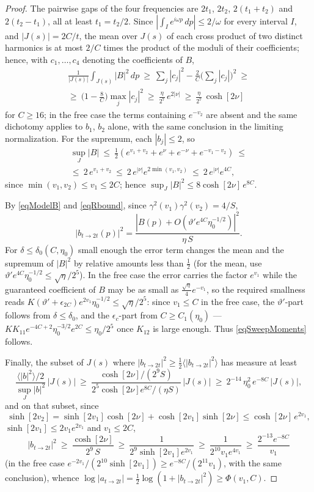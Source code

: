 \documentclass[11pt,twoside,reqno]{amsart}
\def\to{\rightarrow}
\def\d{\delta}
\def\g{\gamma}
\theoremstyle{plain}
\numberwithin{equation}{section}
\begin{document}
\begin{proof}
The pairwise gaps of the four frequencies are $2t_1$, $2t_2$, $2(t_1+t_2)$ and $2(t_2-t_1)$, all at least $t_1=t_2/2$. Since $\left|\int_Ie^{i\omega p}\,dp\right|\leq2/\omega$ for every interval $I$, and $|J(s)|=2C/t$, the mean over $J(s)$ of each cross product of two distinct harmonics is at most $2/C$ times the product of the moduli of their coefficients; hence, with $c_1,\dots,c_4$ denoting the coefficients of $B$,
\begin{multline*}\frac1{|J(s)|}\int_{J(s)}|B|^2\,dp\ \geq\ \sum_j|c_j|^2-\frac 2C\Big(\sum_j|c_j|\Big)^2\ \geq\\ \geq\ \Big(1-\frac{8}C\Big)\max_j|c_j|^2\ \geq\ \frac{\eta}{2^7}\,e^{2|\nu|}\ \geq\ \frac{\eta}{2^7}\,\cosh[2\nu]\end{multline*}
for $C\geq16$; in the free case the terms containing $e^{-v_2}$ are absent and the same dichotomy applies to $b_1$, $b_2$ alone, with the same conclusion in the limiting normalization. For the supremum, each $|b_j|\leq2$, so
\begin{multline*}\sup_J|B|\ \leq\ \frac12\left(e^{v_1+v_2}+e^{\nu}+e^{-\nu}+e^{-v_1-v_2}\right)\ \leq\\ \leq\ 2\,e^{v_1+v_2}\ \leq\ 2\,e^{|\nu|}e^{2\min(v_1,v_2)}\ \leq\ 2\,e^{|\nu|}e^{4C},\end{multline*}
since $\min(v_1,v_2)\leq v_1\leq2C$; hence $\sup_J|B|^2\leq8\cosh[2\nu]\,e^{8C}$.

By \eqref{eqModelB} and \eqref{eqRbound}, since $\g^2(v_1)\g^2(v_2)=4/S$,
$$|b_{t\to2t}(p)|^2=\frac{\left|B(p)+O(\vartheta'e^{4C}\eta_0^{-1/2})\right|^2}{\eta\,S}.$$
For $\d\leq\d_0(C,\eta_0)$ small enough the error term changes the mean and the supremum of $|B|^2$ by relative amounts less than $\tfrac12$ (for the mean, use $\vartheta'e^{4C}\eta_0^{-1/2}\leq\sqrt\eta/2^5$). In the free case the error carries the factor $e^{v_1}$ while the guaranteed coefficient of $B$ may be as small as $\tfrac{\sqrt\eta}4e^{-v_1}$, so the required smallness reads $K\left(\vartheta'+\epsilon_{2C}\right)e^{2v_1}\eta_0^{-1/2}\leq\sqrt\eta/2^5$: since $v_1\leq C$ in the free case, the $\vartheta'$-part follows from $\d\leq\d_0$, and the $\epsilon_c$-part from $C\geq C_1(\eta_0)$ --- $KK_{11}e^{-4C+2}\eta_0^{-3/2}e^{2C}\leq\eta_0/2^5$ once $K_{12}$ is large enough. Thus \eqref{eqSweepMoments} follows.

Finally, the subset of $J(s)$ where $|b_{t\to2t}|^2\geq\frac12\langle|b_{t\to2t}|^2\rangle$ has measure at least
$$\frac{\langle|b|^2\rangle/2}{\sup_J|b|^2}\,|J(s)|\ \geq\ \frac{\cosh[2\nu]/(2^9S)}{2^5\cosh[2\nu]e^{8C}/(\eta S)}\,|J(s)|\ \geq\ 2^{-14}\,\eta_0^2\,e^{-8C}\,|J(s)| ,$$
and on that subset, since
$$\sinh[2v_2]=\sinh[2v_1]\cosh[2\nu]+\cosh[2v_1]\sinh[2\nu]\leq\cosh[2\nu]\,e^{2v_1},$$
$\sinh[2v_1]\leq2v_1e^{2v_1}$ and $v_1\leq2C$,
$$|b_{t\to2t}|^2\ \geq\ \frac{\cosh[2\nu]}{2^9\,S}\ \geq\ \frac1{2^9\sinh[2v_1]e^{2v_1}}\ \geq\ \frac1{2^{10}v_1e^{4v_1}}\ \geq\ \frac{2^{-13}e^{-8C}}{v_1}$$
(in the free case $e^{-2v_1}/(2^{10}\sinh[2v_1])\geq e^{-8C}/(2^{11}v_1)$, with the same conclusion), whence
$\log|a_{t\to2t}|=\frac12\log(1+|b_{t\to2t}|^2)\geq\Phi(v_1,C)$.
\end{proof}
\end{document}
